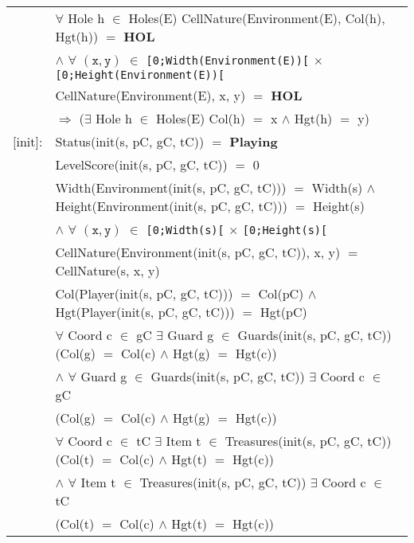 \documentclass[8pt]{article}
\begin{document}
{\begin{longtable}{rl}
  & $\forall$ \textrm{Hole} h $\in$ \textrm{Holes(E)} CellNature(Environment(E), Col(h), Hgt(h)) $=$ \textbf{HOL}\\
  & \quad\quad $\land$ $\forall$ $(\mathtt{x},\mathtt{y})$ $\in$ \texttt{[0;Width(Environment(E))[} $\times$ \texttt{[0;Height(Environment(E))[}\\
  & \quad\quad\quad\quad \textrm{CellNature(Environment(E), x, y)} $=$ \textbf{HOL}\\
  & \quad\quad\quad\quad\quad\quad $\Rightarrow$ ($\exists$ \textrm{Hole} h $\in$ \textrm{Holes(E)} \textrm{Col(h)} $=$ x $\land$ \textrm{Hgt(h)} $=$ y)\\
  \textrm{[init]}:& \textrm{Status(init(s, pC, gC, tC))} $=$ \textbf{Playing}\\
  & \textrm{LevelScore(init(s, pC, gC, tC))} $=$ 0\\
  & \textrm{Width(Environment(init(s, pC, gC, tC)))} $=$ \textrm{Width(s)} $\land$ \textrm{Height(Environment(init(s, pC, gC, tC)))} $=$ \textrm{Height(s)} \\
  & \quad\quad $\land$ $\forall$ $(\mathtt{x},\mathtt{y})$ $\in$ \texttt{[0;Width(s)[} $\times$ \texttt{[0;Height(s)[}\\
  & \quad\quad\quad\quad \textrm{CellNature(Environment(init(s, pC, gC, tC)), x, y)} $=$ \textrm{CellNature(s, x, y)}\\
  & \textrm{Col(Player(init(s, pC, gC, tC)))} $=$ \textrm{Col(pC)} $\land$ \textrm{Hgt(Player(init(s, pC, gC, tC)))} $=$ \textrm{Hgt(pC)}\\
  & $\forall$ \textrm{Coord} c $\in$ gC $\exists$ \textrm{Guard} g $\in$ \textrm{Guards(init(s, pC, gC, tC))} (\textrm{Col(g)} $=$ \textrm{Col(c)} $\land$ \textrm{Hgt(g)} $=$ \textrm{Hgt(c)})\\
  & \quad\quad $\land$ $\forall$ \textrm{Guard} g $\in$ \textrm{Guards(init(s, pC, gC, tC))} $\exists$ \textrm{Coord} c $\in$ gC\\
  & \quad\quad\quad\quad (\textrm{Col(g)} $=$ \textrm{Col(c)} $\land$ \textrm{Hgt(g)} $=$ \textrm{Hgt(c)})\\
  & $\forall$ \textrm{Coord} c $\in$ tC $\exists$ \textrm{Item} t $\in$ \textrm{Treasures(init(s, pC, gC, tC))} (\textrm{Col(t)} $=$ \textrm{Col(c)} $\land$ \textrm{Hgt(t)} $=$ \textrm{Hgt(c)})\\
  & \quad\quad $\land$ $\forall$ \textrm{Item} t $\in$ \textrm{Treasures(init(s, pC, gC, tC))} $\exists$ \textrm{Coord} c $\in$ tC\\
  & \quad\quad\quad\quad (\textrm{Col(t)} $=$ \textrm{Col(c)} $\land$ \textrm{Hgt(t)} $=$ \textrm{Hgt(c)})\\

\end{longtable}}
\end{document}
